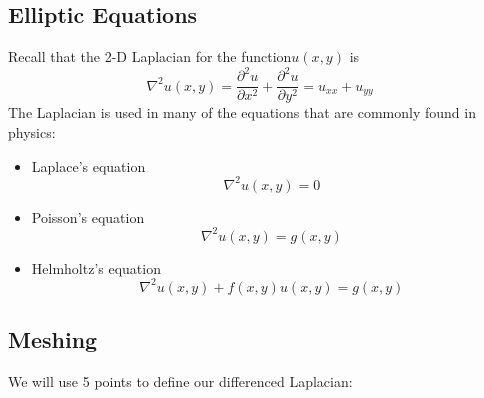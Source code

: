 \documentclass[12pt]{article}
\begin{document}
\subsection{Elliptic Equations}

Recall that the 2-D Laplacian for the function$u(x,y)$ is
%
\begin{equation}
\nabla^2 u(x,y) = \frac{\partial^2 u}{\partial x^2} + \frac{\partial^2 u}{\partial y^2} = u_{xx} + u_{yy} \nonumber
\end{equation}
%
The Laplacian is used in many of the equations that are commonly found in physics:
%
\begin{itemize}
\item Laplace's equation
\[\nabla^2 u(x,y) = 0\]

\item Poisson's equation 
\[\nabla^2 u(x,y) = g(x,y)\]

\item Helmholtz's equation
\[\nabla^2 u(x,y) +f(x,y)u(x,y) = g(x,y)\]
\end{itemize}

\subsection{Meshing}

We will use 5 points to define our differenced Laplacian:
\end{document}
